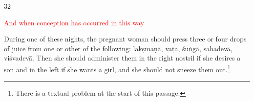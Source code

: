 \begin{translation}
  
\item[32] 

\textcolor{red}{And when conception has occurred in this 
way}\q{\textcolor{red}{Problematic 
passage in the edition.}}

During one of these nights, the pregnant woman should press three or
four drops of juice from one or other of the following:
\gls{lakṣmaṇā}, \gls{vaṭa}, \gls{śuṅgā}, \gls{sahadevā},
\gls{viśvadevā}. Then she should administer them in the right nostril if she
desires a son and in the left if she wants a girl, and she should not
sneeze them out.\footnote{There is a textual problem at the start of this 
passage.}


%
%    
%
%
%
%
%
%
%
%
%
%
%
%


\end{translation}
